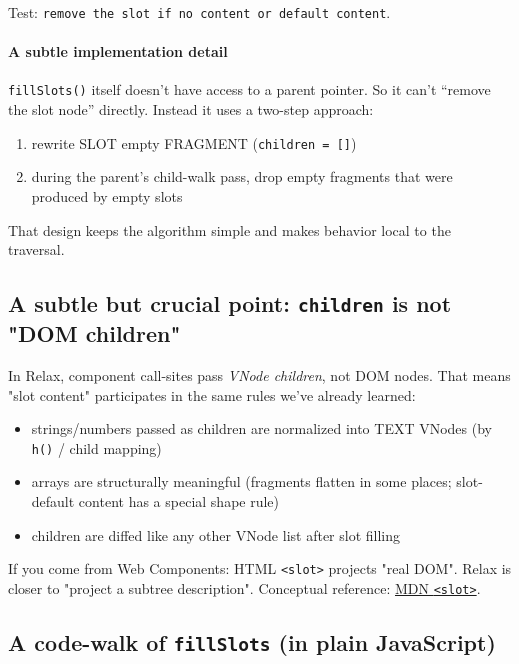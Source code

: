 Test: \texttt{remove the slot if no content or default content}.

\paragraph{A subtle implementation detail}

	\texttt{fillSlots()} itself doesn't have access to a parent pointer.
So it can’t ``remove the slot node'' directly.
Instead it uses a two-step approach:

\begin{enumerate}
  \item rewrite SLOT \textrightarrow empty FRAGMENT (\texttt{children = []})
  \item during the parent’s child-walk pass, drop empty fragments that were produced by empty slots
\end{enumerate}

That design keeps the algorithm simple and makes behavior local to the traversal.

\subsection{A subtle but crucial point: \texttt{children} is not "DOM children"}

In Relax, component call-sites pass \emph{VNode children}, not DOM nodes.
That means "slot content" participates in the same rules we've already learned:

\begin{itemize}
  \item strings/numbers passed as children are normalized into TEXT VNodes (by \texttt{h()} / child mapping)
  \item arrays are structurally meaningful (fragments flatten in some places; slot-default content has a special shape rule)
  \item children are diffed like any other VNode list after slot filling
\end{itemize}

If you come from Web Components: HTML \texttt{<slot>} projects "real DOM".
Relax is closer to "project a subtree description".
Conceptual reference: \href{https://developer.mozilla.org/en-US/docs/Web/API/Web_components/Using_templates_and_slots}{MDN \texttt{<slot>}}.

\subsection{A code-walk of \texttt{fillSlots} (in plain JavaScript)}

